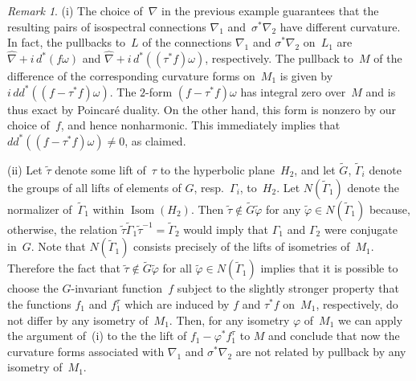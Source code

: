\documentclass[12pt,leqno]{amsart}%
\theoremstyle{definition}
\theoremstyle{remark}
\newtheorem{remark}[theorem]{Remark}
\numberwithin{equation}{section}
\begin{document}
\begin{remark}

(i) The choice of~${\nabla}$ in the previous example guarantees that the
resulting
pairs of isospectral connections ${\nabla}_{1}$ and~$\sigma^{*}{\nabla}_{2}$
have different curvature. In fact, the pullbacks to~$L$ of the connections
${\nabla}_{1}$ and $\sigma^{*}{\nabla}_{2}$ on~$L_{1}$ are $\widehat{\nabla}+
i\,d^*(f\omega)$ and $\widehat{\nabla}+ i\,d^*((\tau^{*}f)\omega)$,
respectively. The pullback to~$M$ of the difference of the corresponding
curvature forms on~$M_{1}$ is given by $i\,d d^*((f-\tau^{*}f)\omega)$.
The $2$-form $(f-\tau^{*}f)\omega$ has integral zero over~$M$ and is thus exact
by Poincar\'e duality. On the other hand, this form is nonzero by our choice
of~$f$, and hence nonharmonic. This immediately implies that
$d d^*((f-\tau^{*}f)\omega)\ne0$, as claimed.

(ii) Let $\widetilde\tau$ denote some lift of~$\tau$ to the hyperbolic plane~$H_2$,
and let $\widetilde G$, $\widetilde\Gamma_i$ denote the groups of all lifts of elements
of $G$, resp.~$\Gamma_i$, to~$H_2$. Let $N(\widetilde\Gamma_1)$ denote the
normalizer of~$\widetilde\Gamma_1$ within $\operatorname{Isom}(H_2)$.
Then $\widetilde\tau\notin\widetilde G\widetilde\varphi$ for any $\widetilde\varphi\in
N(\widetilde\Gamma_1)$
because, otherwise,
the relation $\widetilde\tau\widetilde\Gamma_1\widetilde\tau^{-1}=\widetilde\Gamma_2$ would
imply
that $\Gamma_1$ and $\Gamma_2$ were conjugate in~$G$.
Note that $N(\widetilde\Gamma_1)$ consists precisely of the lifts of isometries
of~$M_1$.
Therefore the fact that $\widetilde\tau\notin\widetilde G\widetilde\varphi$
for all $\widetilde\varphi\in N(\widetilde\Gamma_1)$
implies that it is possible to choose
the $G$-invariant function~$f$
subject to the slightly stronger property
that the functions $f_1$ and $f_1^\tau$
which are induced by $f$ and $\tau^*f$ on~$M_1$, respectively,
do not differ by any isometry of~$M_1$.
Then, for any isometry $\varphi$ of~$M_1$ we can apply the
argument of~(i) to the the lift of $f_1-\varphi^* f_1^\tau$ to $M$
and conclude that now the curvature forms associated with
$\nabla_1$ and $\sigma^*\nabla_2$ are not related by
pullback by any isometry of~$M_1$.
\end{remark}
\end{document}
